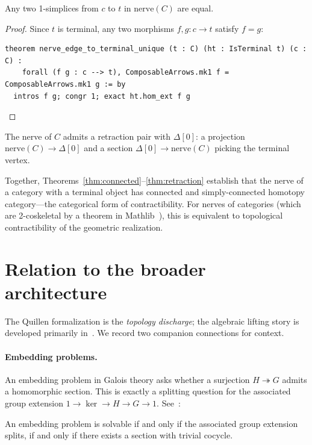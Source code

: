 \documentclass[11pt]{article}
\newcommand{\nerve}{\mathrm{nerve}}
\begin{document}
\begin{theorem}\label{thm:unique}
Any two 1-simplices from $c$ to $t$ in $\nerve(C)$ are equal.
\end{theorem}

\begin{proof}
Since $t$ is terminal, any two morphisms $f, g : c \to t$ satisfy $f = g$:
\begin{lstlisting}
theorem nerve_edge_to_terminal_unique (t : C) (ht : IsTerminal t) (c : C) :
    forall (f g : c --> t), ComposableArrows.mk1 f = ComposableArrows.mk1 g := by
  intros f g; congr 1; exact ht.hom_ext f g
\end{lstlisting}
\end{proof}

\begin{theorem}[Retraction]\label{thm:retraction}
The nerve of $C$ admits a retraction pair with $\Delta[0]$: a projection
$\nerve(C) \to \Delta[0]$ and a section $\Delta[0] \to \nerve(C)$ picking the
terminal vertex.
\end{theorem}

Together, Theorems~\ref{thm:connected}--\ref{thm:retraction} establish that
the nerve of a category with a terminal object has connected and
simply-connected homotopy category---the categorical form of contractibility.
For nerves of categories (which are 2-coskeletal by a theorem in
Mathlib~\cite{Mathlib}), this is equivalent to topological contractibility of
the geometric realization.

\section{Relation to the broader architecture}\label{sec:broader}

The Quillen formalization is the \emph{topology discharge}; the algebraic lifting story is
developed primarily in~\cite{SpivackFiber}. We record two companion connections for context.

\paragraph{Embedding problems.}
An embedding problem in Galois theory asks whether a surjection
$H \twoheadrightarrow G$ admits a homomorphic section. This is exactly a
splitting question for the associated group extension
$1 \to \ker \to H \to G \to 1$. See~\cite{SpivackFiber}:

\begin{theorem}\label{thm:embed}
An embedding problem is solvable if and only if the associated group extension
splits, if and only if there exists a section with trivial cocycle.
\end{theorem}
\end{document}
